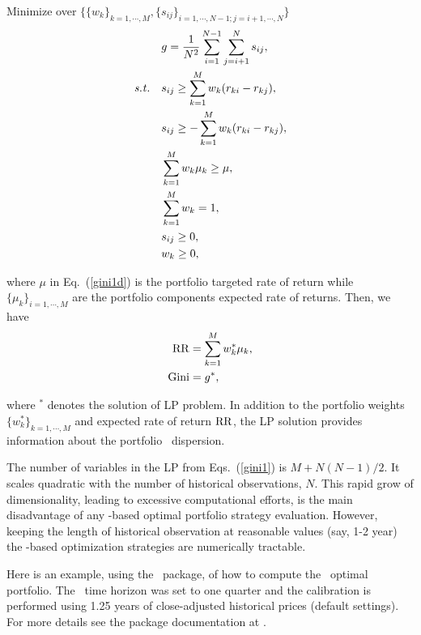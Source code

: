 \bigskip
\noindent Minimize over $\{ \{w_k\}_{k=1,\cdots,M}, \{s_{ij}\}_{i=1,\cdots,N-1; j = i+1,\cdots,N} \}$
\begin{subequations}\label{gini1}
\begin{align}
    &g = \frac{1}{N^2} \sum_{i=1}^{N-1} \sum_{j = i+1}^N s_{ij}, \label{gini1a} \\
    \st &s_{ij} \geq \sum_{k=1}^M w_k (r_{ki} - r_{kj}), \label{gini1b} \\
        &s_{ij} \geq -\sum_{k=1}^M w_k (r_{ki} - r_{kj}), \label{gini1c} \\
        &\sum_{k=1}^M w_k \mu_k \geq \mu, \label{gini1d} \\
        & \sum_{k=1}^M w_k = 1, \label{gini1e} \\
        & s_{ij} \geq 0, \label{gini1g} \\
        & w_k \geq 0, \label{gini1f}
\end{align}
\end{subequations}

\noindent where $\mu$ in Eq.~(\ref{gini1d}) is the portfolio targeted rate of return while $\{\mu_k\}_{i=1,\cdots,M}$
are the portfolio components expected rate of returns.
Then, we have
\begin{subequations}\label{gini2}
\begin{align}
    \RR &= \sum_{k=1}^M w_k^* \mu_k, \label{gini2a} \\
    \GINI &= g^*, \label{gini2b}
\end{align}
\end{subequations}

\noindent where $^*$ denotes the solution of LP problem.
In addition to the portfolio weights $\{w_k^*\}_{k=1,\cdots,M}$ and expected rate of return ${\rm RR}$, the
LP solution provides information about the portfolio \GINI\ dispersion.

The number of variables in the LP from Eqs.\ (\ref{gini1}) is $M + N(N-1)/2$. It scales quadratic with the number
of historical observations, $N$.
This rapid grow of dimensionality, leading to excessive computational efforts, is the main disadvantage of any \GINI-based optimal portfolio
strategy evaluation. However, keeping the length of historical observation at reasonable values (say, 1-2 year) the \GINI-based
optimization strategies are numerically tractable.

\bigskip
\noindent Here is an example, using the \azapy\ package, of how to compute the \GINI\ optimal portfolio.
The \GINI\ time horizon was set to one quarter and the calibration is performed using 1.25 years of
close-adjusted historical prices (default settings).
For more details see the package documentation at \azapydoc.

